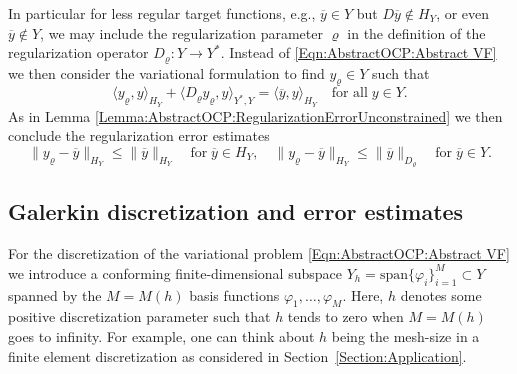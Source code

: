 \documentclass{article}
\numberwithin{equation}{section}
\begin{document}
\noindent
In particular for less regular target functions, e.g.,
$\overline{y} \in Y$ but $D \overline{y} \not\in H_Y$, or even
$\overline{y} \not\in Y$, we may include the regularization
parameter $\varrho$ in the definition of the regularization
operator $D_\varrho : Y \to Y^*$. Instead of
\eqref{Eqn:AbstractOCP:Abstract VF} we then consider the
variational formulation to find $y_\varrho \in Y$ such that
\begin{equation}\label{Eqn:AbstractOCP:Abstract VF Drho}
  \langle y_\varrho , y \rangle_{H_Y} +
  \langle D_\varrho y_\varrho , y  \rangle_{Y^*,Y} =
  \langle \overline{y} , y \rangle_{H_Y} \quad
  \mbox{for all} \; y \in Y .
\end{equation}
As in Lemma \ref{Lemma:AbstractOCP:RegularizationErrorUnconstrained}
we then conclude the regularization error estimates
\begin{equation}\label{Eqn:AbstractOCP:Regularization Drho}
  \| y_\varrho - \overline{y} \|_{H_Y} \leq \| \overline{y} \|_{H_Y}
  \quad \mbox{for} \; \overline{y} \in H_Y, \quad
  \| y_\varrho - \overline{y} \|_{H_Y} \leq
  \| \overline{y} \|_{D_\varrho} \quad \mbox{for} \;
  \overline{y} \in Y.
\end{equation}
  
\subsection{Galerkin discretization and error estimates}
\label{Subsection:AbstractOCP:Disrectization}
For the discretization of the variational problem
\eqref{Eqn:AbstractOCP:Abstract VF} we introduce a conforming
finite-dimensional subspace
$Y_h = \mbox{span} \{ \varphi_i \}_{i=1}^M \subset Y$
spanned by the $M=M(h)$ basis functions $\varphi_1,\ldots,\varphi_M$.
Here, $h$ denotes some positive discretization parameter such that
$h$ tends to zero when $M=M(h)$ goes to infinity. For example, one can
think about $h$ being the mesh-size in a finite element 
discretization as considered in Section~\ref{Section:Application}. 
\end{document}
